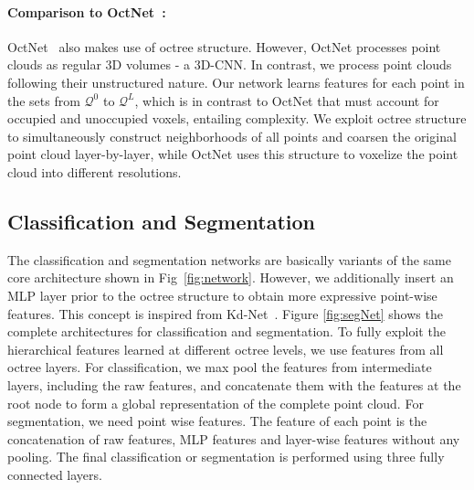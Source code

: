 \documentclass[10pt,twocolumn,letterpaper]{article}
\begin{document}
{\paragraph{Comparison to OctNet~\cite{riegler2017octnet}:}   OctNet~\cite{riegler2017octnet}  also makes use of octree structure. However, OctNet processes point clouds as regular 3D volumes - a  3D-CNN.
In  contrast, we process point clouds following their  unstructured nature.
Our network  learns features  for each point in the sets from $\mathcal{Q}^0$ to $\mathcal{Q}^L$, which is in contrast to OctNet that must account for occupied and unoccupied voxels, entailing complexity.  
We exploit octree structure to simultaneously construct  neighborhoods of all points and coarsen the original point cloud layer-by-layer, while OctNet uses this structure to voxelize the point cloud into different resolutions.


\subsection{Classification and Segmentation}
\vspace{-2mm}
The classification and segmentation networks are basically variants of the same core architecture shown in Fig~\ref{fig:network}. 
However, we additionally insert an MLP layer prior to the octree structure to obtain more expressive point-wise features. This concept is inspired from Kd-Net~\cite{klokov2017escape}. Figure \ref{fig:segNet} shows the complete architectures for classification and segmentation. To fully exploit the hierarchical features learned at different octree levels, we use features from all octree layers. For classification, we max pool the features from intermediate layers, including the raw features, and concatenate them with the features at the root node to form a global representation of the complete point cloud. For segmentation, we need point wise features. The feature of each point is the concatenation of raw features, MLP features and layer-wise features without any pooling. The final classification or segmentation is performed using three fully connected layers.




}
\end{document}
